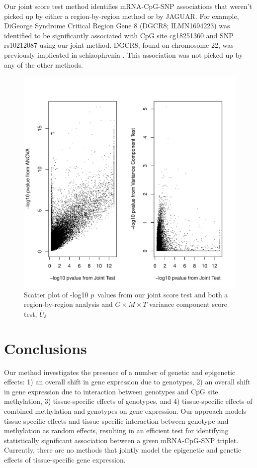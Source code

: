 \documentclass[hidelinks]{article}
\begin{document}
Our joint score test method identifies mRNA-CpG-SNP associations 	that weren't picked up by either a region-by-region method or by JAGUAR. For example, DiGeorge Syndrome Critical Region Gene 8 (DGCR8; ILMN1694223) was identified to be significantly associated with CpG site cg18251360 and SNP rs10212087 using our joint method. DGCR8, found on chromosome 22, was previously implicated in schizophrenia \cite{dgcr}. This association was not picked up by any of the other methods. 

\begin{center}
\begin{figure}[H]
\includegraphics[width=\textwidth]{jt_plots.pdf}
\caption{Scatter plot of -log10 $p$~values from our joint score test and both a region-by-region analysis and $G \times M \times T$ variance component score test, $\ddot{U_\delta}$}
\end{figure}
\end{center}

\section{Conclusions}

Our method investigates the presence of a number of genetic and epigenetic effects: 1) an overall shift in gene expression due to genotypes, 2) an overall shift in gene expression due to interaction between genotypes and CpG site methylation, 3) tissue-specific effects of genotypes,  and 4) tissue-specific effects of combined methylation and genotypes on gene expression. Our approach models tissue-specific effects and tissue-specific interaction between genotype and methylation as random effects, resulting in an efficient test for identifying statistically significant association between a given mRNA-CpG-SNP triplet. Currently, there are no methods that jointly model the epigenetic and genetic effects of tissue-specific gene expression. 
\end{document}
